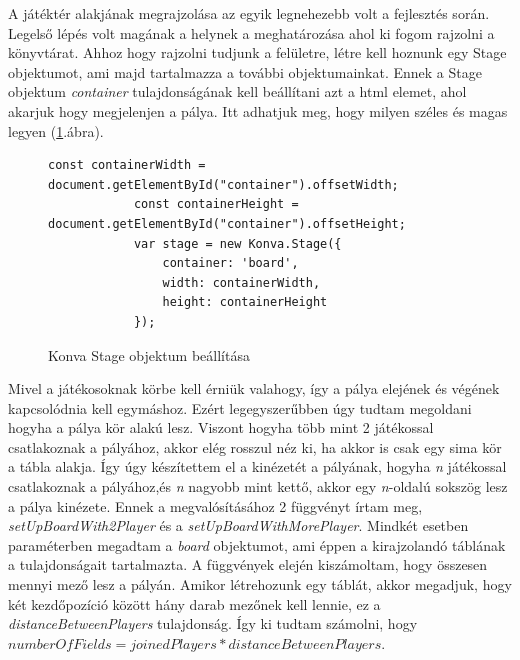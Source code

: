 \documentclass[a4paper,twoside]{article}
\begin{document}
A játéktér alakjának megrajzolása az egyik legnehezebb volt a fejlesztés során. Legelső lépés volt magának a helynek a meghatározása ahol ki fogom rajzolni a könyvtárat. Ahhoz hogy rajzolni tudjunk a felületre, létre kell hoznunk egy Stage objektumot, ami majd tartalmazza a további objektumainkat. Ennek a Stage objektum \textit{container} tulajdonságának kell beállítani azt a html elemet, ahol akarjuk hogy megjelenjen a pálya. Itt adhatjuk meg, hogy milyen széles és magas legyen (\ref{konvaStage}.ábra). 

\begin{figure}
	\caption{Konva Stage objektum beállítása}
	\begin{minipage}{\textwidth}
		\begin{lstlisting}[style=javascriptStyle]
			 const containerWidth = document.getElementById("container").offsetWidth;
			const containerHeight = document.getElementById("container").offsetHeight;
			var stage = new Konva.Stage({
				container: 'board',
				width: containerWidth,
				height: containerHeight
			});
		\end{lstlisting}
	\end{minipage}
	
	\label{konvaStage}
\end{figure}
\FloatBarrier

Mivel a játékosoknak körbe kell érniük valahogy, így a pálya elejének és végének kapcsolódnia kell egymáshoz. Ezért legegyszerűbben úgy tudtam megoldani hogyha a pálya kör alakú lesz. Viszont hogyha több mint 2 játékossal csatlakoznak a pályához, akkor elég rosszul néz ki, ha akkor is csak egy sima kör a tábla alakja. Így úgy készítettem el a kinézetét a pályának, hogyha \textit{n} játékossal csatlakoznak a pályához,és \textit{n} nagyobb mint kettő, akkor egy \textit{n}-oldalú sokszög lesz a pálya kinézete. Ennek a megvalósításához 2 függvényt írtam meg, \textit{setUpBoardWith2Player} és a \textit{setUpBoardWithMorePlayer}. Mindkét esetben paraméterben megadtam a \textit{board} objektumot, ami éppen a kirajzolandó táblának a tulajdonságait tartalmazta. A függvények elején kiszámoltam, hogy összesen mennyi mező lesz a pályán. Amikor létrehozunk egy táblát, akkor megadjuk, hogy két kezdőpozíció között hány darab mezőnek kell lennie, ez a \textit{distanceBetweenPlayers} tulajdonság. Így ki tudtam számolni, hogy \(numberOfFields = joinedPlayers * distanceBetweenPlayers\).
\end{document}
